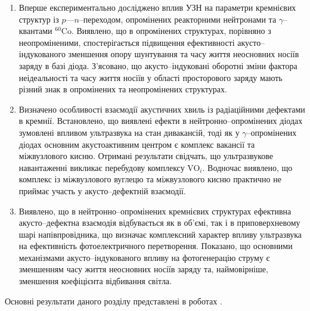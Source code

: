 \begin{enumerate}[leftmargin=0cm,itemindent=3em]
     \item Вперше експериментально досліджено вплив УЗН на параметри кремнієвих структур із $p$---$n$--переходом, опромінених  реакторними нейтронами та $\gamma$--квантами $^{60}$Co.
      Виявлено, що в опромінених структурах, порівняно з неопроміненими, спостерігається підвищення ефективності акусто--індукованого зменшення  опору шунтування та часу життя неосновних носіїв заряду в базі діода.
      З'ясовано, що акусто--індуковані оборотні зміни фактора неідеальності та часу життя носіїв у області просторового заряду   мають різний знак в опромінених та неопромінених структурах.

      \item Визначено особливості взаємодії акустичних хвиль із радіаційними дефектами в кремнії.
      Встановлено, що виявлені ефекти в нейтронно--опромінених діодах зумовлені впливом ультразвука на стан дивакансій,  тоді як у $\gamma$--опромінених діодах основним акустоактивним центром є комплекс вакансії та міжвузлового кисню.
     Отримані результати свідчать, що ультразвукове навантаженні викликає перебудову комплексу VO$_i$.
     Водночас виявлено, що комплекс із міжвузлового вуглецю та міжвузлового кисню практично не приймає участь у
     акусто--дефектній взаємодії.


     \item Виявлено, що в нейтронно--опромінених кремнієвих структурах ефективна акусто--дефектна
     взаємодія відбувається як в об'ємі, так і в приповерхневому шарі напівпровідника, що
визначає комплексний характер впливу ультразвука на ефективність фотоелектричного перетворення.
Показано, що основними механізмами акусто--індукованого впливу на фотогенерацію струму є зменшенням часу життя неосновних носіїв заряду та,
наймовірніше, зменшення коефіцієнта відбивання світла.
  \end{enumerate}	

Основні результати даного розділу представлені в роботах
\cite{Olikh:Visn2003,Olikh:MRS2007a,Olikh:SEMT2007,Olikh:FTP2009,Olikh:UPJ2010,Olikh:FTP2011,Olikh2018JAP,Olikh2018SM,
1SEMST,2005IUS,ICU2007SC,2007MRS,3UNCPS,2009DRIP13,6Drog,4UNCPS,4Kremen,6SEMST,2017MEICS}.



